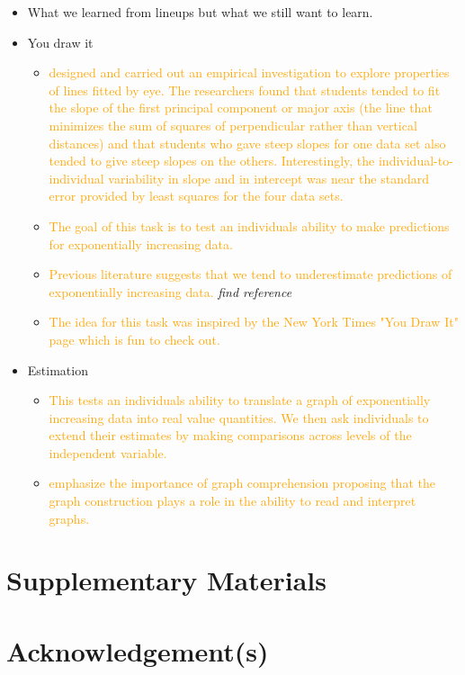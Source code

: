 \documentclass[]{interact}
\theoremstyle{plain}%
\theoremstyle{definition}
\theoremstyle{remark}
\begin{document}
\begin{itemize}
\item
  What we learned from lineups but what we still want to learn.
\item
  You draw it

  \begin{itemize}
  \item
    \citep{mosteller_eye_1981}
    \textcolor{Orange}{designed and carried out an empirical investigation to explore properties of lines fitted by eye. The researchers found that students tended to fit the slope of the first principal component or major axis (the line that minimizes the sum of squares of perpendicular rather than vertical distances) and that students who gave steep slopes for one data set also tended to give steep slopes on the others. Interestingly, the individual-to-individual variability in slope and in intercept was near the standard error provided by least squares for the four data sets.}
  \item
    \textcolor{Orange}{The goal of this task is to test an individuals ability to make predictions for exponentially increasing data.}
  \item
    \textcolor{Orange}{Previous literature suggests that we tend to underestimate predictions of exponentially increasing data.}
    \emph{find reference}
  \item
    \textcolor{Orange}{The idea for this task was inspired by the New York Times "You Draw It" page which is fun to check out.}
  \end{itemize}
\item
  Estimation

  \begin{itemize}
  \item
    \textcolor{Orange}{This tests an individuals ability to translate a graph of exponentially increasing data into real value quantities. We then ask individuals to extend their estimates by making comparisons across levels of the independent variable.}
  \item
    \citep{friel_making_2001}
    \textcolor{Orange}{emphasize the importance of graph comprehension proposing that the graph construction plays a role in the ability to read and interpret graphs.}
  \end{itemize}
\end{itemize}

\hypertarget{supplementary-materials}{%
\section*{Supplementary Materials}\label{supplementary-materials}}

\hypertarget{acknowledgements}{%
\section*{Acknowledgement(s)}\label{acknowledgements}}



\end{document}
